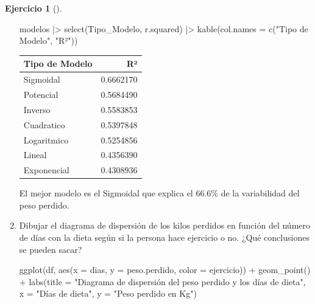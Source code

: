 \documentclass[
  a4paper,
]{scrreport}
\newenvironment{Shaded}{\begin{snugshade}}{\end{snugshade}}
\newcommand{\AttributeTok}[1]{\textcolor[rgb]{0.40,0.45,0.13}{#1}}
\newcommand{\FunctionTok}[1]{\textcolor[rgb]{0.28,0.35,0.67}{#1}}
\newcommand{\NormalTok}[1]{\textcolor[rgb]{0.00,0.23,0.31}{#1}}
\newcommand{\SpecialCharTok}[1]{\textcolor[rgb]{0.37,0.37,0.37}{#1}}
\newcommand{\StringTok}[1]{\textcolor[rgb]{0.13,0.47,0.30}{#1}}
\theoremstyle{definition}
\newtheorem{exercise}{Ejercicio}[chapter]
\theoremstyle{remark}
\begin{document}
\begin{exercise}[]
\begin{enumerate}
\begin{tcolorbox}
\begin{Shaded}
\begin{Highlighting}[]
\NormalTok{modelos  }\SpecialCharTok{|\textgreater{}}
    \FunctionTok{select}\NormalTok{(Tipo\_Modelo, r.squared)  }\SpecialCharTok{|\textgreater{}} 
    \FunctionTok{kable}\NormalTok{(}\AttributeTok{col.names =} \FunctionTok{c}\NormalTok{(}\StringTok{"Tipo de Modelo"}\NormalTok{, }\StringTok{"R²"}\NormalTok{))}
\end{Highlighting}
\end{Shaded}

  \begin{longtable}[]{@{}lr@{}}
  \toprule\noalign{}
  Tipo de Modelo & R² \\
  \midrule\noalign{}
  \endhead
  \bottomrule\noalign{}
  \endlastfoot
  Sigmoidal & 0.6662170 \\
  Potencial & 0.5684490 \\
  Inverso & 0.5583853 \\
  Cuadratico & 0.5397848 \\
  Logaritmico & 0.5254856 \\
  Lineal & 0.4356390 \\
  Exponencial & 0.4308936 \\
  \end{longtable}

  El mejor modelo es el Sigmoidal que explica el 66.6\% de la
  variabilidad del peso perdido.

  \end{tcolorbox}
\item
  Dibujar el diagrama de dispersión de los kilos perdidos en función del
  número de días con la dieta según si la persona hace ejercicio o no.
  ¿Qué conclusiones se pueden sacar?

  \begin{tcolorbox}[enhanced jigsaw, colframe=quarto-callout-tip-color-frame, toprule=.15mm, bottomtitle=1mm, breakable, opacitybacktitle=0.6, toptitle=1mm, colback=white, bottomrule=.15mm, title=\textcolor{quarto-callout-tip-color}{\faLightbulb}\hspace{0.5em}{Solución}, arc=.35mm, left=2mm, titlerule=0mm, rightrule=.15mm, coltitle=black, leftrule=.75mm, opacityback=0, colbacktitle=quarto-callout-tip-color!10!white]

\begin{Shaded}
\begin{Highlighting}[]
\FunctionTok{ggplot}\NormalTok{(df, }\FunctionTok{aes}\NormalTok{(}\AttributeTok{x =}\NormalTok{ dias, }\AttributeTok{y =}\NormalTok{ peso.perdido, }\AttributeTok{color =}\NormalTok{ ejercicio)) }\SpecialCharTok{+}
    \FunctionTok{geom\_point}\NormalTok{() }\SpecialCharTok{+}
    \FunctionTok{labs}\NormalTok{(}\AttributeTok{title =} \StringTok{"Diagrama de dispersión del peso perdido y los días de dieta"}\NormalTok{, }\AttributeTok{x =} \StringTok{"Días de dieta"}\NormalTok{, }\AttributeTok{y =} \StringTok{"Peso perdido en Kg"}\NormalTok{)}
\end{Highlighting}
\end{Shaded}


\end{tcolorbox}
\end{enumerate}
\end{exercise}
\end{document}

